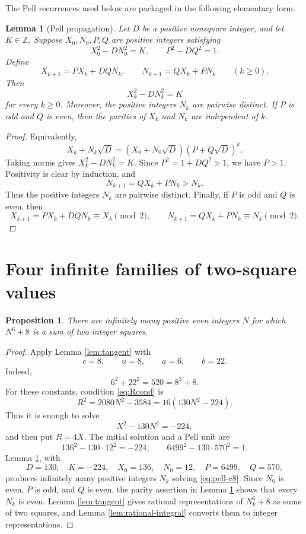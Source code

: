 \documentclass{article}
\theoremstyle{plain}
\newtheorem{proposition}{Proposition}[section]
\theoremstyle{remark}
\theoremstyle{myconjecture}
\theoremstyle{plain}
\newtheorem{lemma}[theorem]{Lemma}
\theoremstyle{definition}
\numberwithin{equation}{section} %
\begin{document}
The Pell recurrences used below are packaged in the following elementary form.

\begin{lemma}[Pell propagation]\label{lem:pell}
Let \(D\) be a positive nonsquare integer, and let \(K\in\mathbb Z\).  Suppose
\(X_0,N_0,P,Q\) are positive integers satisfying
\[
        X_0^2-DN_0^2=K,
        \qquad
        P^2-DQ^2=1.
\]
Define
\[
        X_{k+1}=PX_k+DQN_k,
        \qquad
        N_{k+1}=QX_k+PN_k
        \qquad(k\ge0).
\]
Then
\[
        X_k^2-DN_k^2=K
\]
for every \(k\ge0\).  Moreover, the positive integers \(N_k\) are pairwise
distinct.  If \(P\) is odd and \(Q\) is even, then the parities of \(X_k\) and
\(N_k\) are independent of \(k\).
\end{lemma}

\begin{proof}
Equivalently,
\[
        X_k+N_k\sqrt D=(X_0+N_0\sqrt D)(P+Q\sqrt D)^k.
\]
Taking norms gives \(X_k^2-DN_k^2=K\).  Since \(P^2=1+DQ^2>1\), we have
\(P>1\).  Positivity is clear by induction, and
\[
        N_{k+1}=QX_k+PN_k>N_k.
\]
Thus the positive integers \(N_k\) are pairwise distinct.  Finally, if \(P\) is
odd and \(Q\) is even, then
\[
        X_{k+1}=PX_k+DQN_k\equiv X_k\pmod2,
        \qquad
        N_{k+1}=QX_k+PN_k\equiv N_k\pmod2.
\]
\end{proof}

\section{Four infinite families of two-square values}

\begin{proposition}\label{prop:c8}
There are infinitely many positive even integers \(N\) for which \(N^6+8\) is a
sum of two integer squares.
\end{proposition}

\begin{proof}
Apply Lemma \ref{lem:tangent} with
\[
        c=8,
        \qquad u=8,
        \qquad a=6,
        \qquad b=22.
\]
Indeed,
\[
        6^2+22^2=520=8^3+8.
\]
For these constants, condition \eqref{eq:Rcond} is
\[
        R^2=2080N^2-3584=16(130N^2-224).
\]
Thus it is enough to solve
\[
        X^2-130N^2=-224,                    \tag{4}\label{eq:pell-c8}
\]
and then put \(R=4X\).  The initial solution and a Pell unit are
\[
        136^2-130\cdot 12^2=-224,
        \qquad
        6499^2-130\cdot570^2=1.
\]
Lemma \ref{lem:pell}, with
\[
        D=130,
        \quad K=-224,
        \quad X_0=136,
        \quad N_0=12,
        \quad P=6499,
        \quad Q=570,
\]
produces infinitely many positive integers \(N_k\) solving
\eqref{eq:pell-c8}.  Since \(N_0\) is even, \(P\) is odd, and \(Q\) is even,
the parity assertion in Lemma \ref{lem:pell} shows that every \(N_k\) is even.
Lemma \ref{lem:tangent} gives rational representations of \(N_k^6+8\) as sums
of two squares, and Lemma \ref{lem:rational-integral} converts them to integer
representations.
\end{proof}
\end{document}
